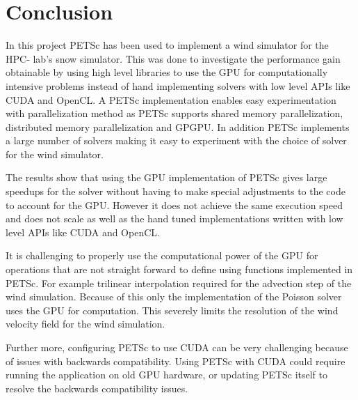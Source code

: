 \chapter{Conclusion}

In this project PETSc has been used to implement a wind simulator for the HPC-
lab's snow simulator. This was done to investigate the performance gain
obtainable by using high level libraries to use the GPU for computationally
intensive problems instead of hand implementing solvers with low level APIs like
CUDA and OpenCL. A PETSc implementation enables easy experimentation with
parallelization method as PETSc supports shared memory parallelization,
distributed memory parallelization and GPGPU. In addition PETSc implements a
large number of solvers making it easy to experiment with the choice of solver
for the wind simulator.

The results show that using the GPU implementation of PETSc gives large speedups
for the solver without having to make special adjustments to the code to account
for the GPU. However it does not achieve the same execution speed and does not
scale as well as the hand tuned implementations written with low level APIs like
CUDA and OpenCL.

It is challenging to properly use the computational power of the GPU for
operations that are not straight forward to define using functions implemented
in PETSc. For example trilinear interpolation required for the advection step of
the wind simulation. Because of this only the implementation of the Poisson
solver uses the GPU for computation. This severely limits the resolution of
the wind velocity field for the wind simulation.

Further more, configuring PETSc to use CUDA can be very challenging because of
issues with backwards compatibility. Using PETSc with CUDA could require running
the application on old GPU hardware, or updating PETSc itself to resolve the
backwards compatibility issues.
